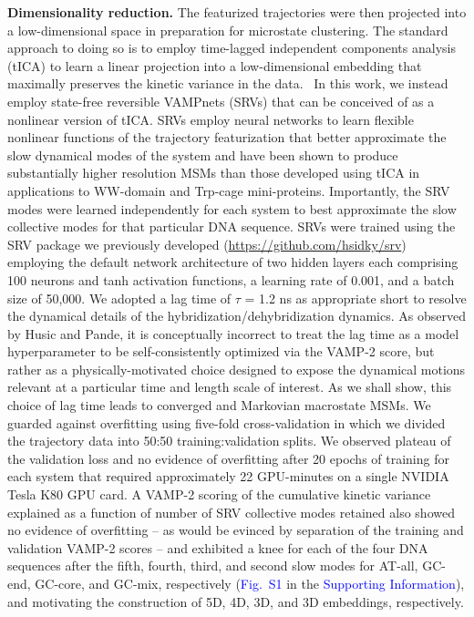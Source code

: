 \documentclass[journal=jpcbfk,manuscript=article]{achemso}
\newcommand*{\blauw}[1]{\textcolor{blue}{#1}}
\begin{document}
\textbf{Dimensionality reduction.} The featurized trajectories were then projected into a low-dimensional space in preparation for microstate clustering. The standard approach to doing so is to employ time-lagged independent components analysis (tICA) to learn a linear projection into a low-dimensional embedding that maximally preserves the kinetic variance in the data.~\citep{Perez-Hernandez2013IdentificationConstruction, Schwantes2013ImprovementsNTL9, Noe2015KineticSimulation} In this work, we instead employ state-free reversible VAMPnets (SRVs) that can be conceived of as a nonlinear version of tICA. \citep{Chen} SRVs employ neural networks to learn flexible nonlinear functions of the trajectory featurization that better approximate the slow dynamical modes of the system and have been shown to produce substantially higher resolution MSMs than those developed using tICA in applications to WW-domain and Trp-cage mini-proteins.\citep{Chen, Sidky} Importantly, the SRV modes were learned independently for each system to best approximate the slow collective modes for that particular DNA sequence. SRVs were trained using the SRV package we previously developed (\url{https://github.com/hsidky/srv}) employing the default network architecture of two hidden layers each comprising 100 neurons and tanh activation functions, a learning rate of 0.001, and a batch size of 50,000. We adopted a lag time of $\tau$ = 1.2 ns as appropriate short to resolve the dynamical details of the hybridization/dehybridization dynamics. \citep{Phys2018MarkovValidation} As observed by Husic and Pande, it is conceptually incorrect to treat the lag time as a model hyperparameter to be self-consistently optimized via the VAMP-2 score, but rather as a physically-motivated choice designed to expose the dynamical motions relevant at a particular time and length scale of interest. \citep{Husic2017Note:Selection} As we shall show, this choice of lag time leads to converged and Markovian macrostate MSMs. We guarded against overfitting using five-fold cross-validation in which we divided the trajectory data into 50:50 training:validation splits. We observed plateau of the validation loss and no evidence of overfitting after 20 epochs of training for each system that required approximately 22 GPU-minutes on a single NVIDIA Tesla K80 GPU card. A VAMP-2 scoring of the cumulative kinetic variance explained as a function of number of SRV collective modes retained also showed no evidence of overfitting -- as would be evinced by separation of the training and validation VAMP-2 scores \citep{Sidky} -- and exhibited a knee for each of the four DNA sequences after the fifth, fourth, third, and second slow modes for AT-all, GC-end, GC-core, and GC-mix, respectively (\blauw{Fig.~S1} in the \blauw{Supporting Information}), and motivating the construction of 5D, 4D, 3D, and 3D embeddings, respectively.
\end{document}
